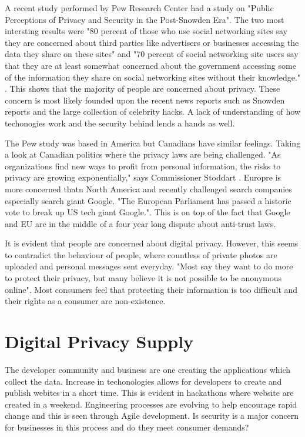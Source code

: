 \documentclass[12pt]{article}
\begin{document}
A recent study performed by Pew Research Center had a study on "Public Perceptions of Privacy and Security in the Post-Snowden Era". The two most intersting results were "80 percent of those who use social networking sites say they are concerned about third parties like advertisers or businesses accessing the data they share on these sites" and "70 percent of social networking site users say that they are at least somewhat concerned about the government accessing some of the information they share on social networking sites without their knowledge." \cite{Madden}. This shows that the majority of people are concerned about privacy. These concern is most likely founded upon the recent news reports such as Snowden reports and the large collection of celebrity hacks. A lack of understanding of how techonogies work and the security behind lends a hands as well.

The Pew study was based in America but Canadians have similar feelings. Taking a look at Canadian politics where the privacy laws are being challenged. "As organizations find new ways to profit from personal information, the risks to privacy are growing exponentially," says Commissioner Stoddart \cite{PrivacyCommissioner}. Europre is more concerned thatn North America and recently challenged search companies especially search giant Google. "The European Parliament has passed a historic vote to break up US tech giant Google."\cite{Cook}. This is on top of the fact that Google and EU are in the middle of a four year long dispute about anti-trust laws.

It is evident that people are concerned about digital privacy. However, this seems to contradict the behaviour of people, where countless of private photos are uploaded and personal messages sent everyday. "Most say they want to do more to protect their privacy, but many believe it is not possible to be anonymous online"\cite{Madden}. Most consumers feel that protecting their information is too difficult and their rights as a consumer are non-existence. 

\section{Digital Privacy Supply}\label{sec:supply}
The developer community and business are one creating the applications which collect the data. Increase in techonologies allows for developers to create and publish webites in a short time. This is evident in hackathons where website are created in a weekend. Engineering processes are evolving to help encourage rapid change and this is seen through Agile development. Is security is a major concern for businesses in this process and do they meet consumer demands?
\end{document}
